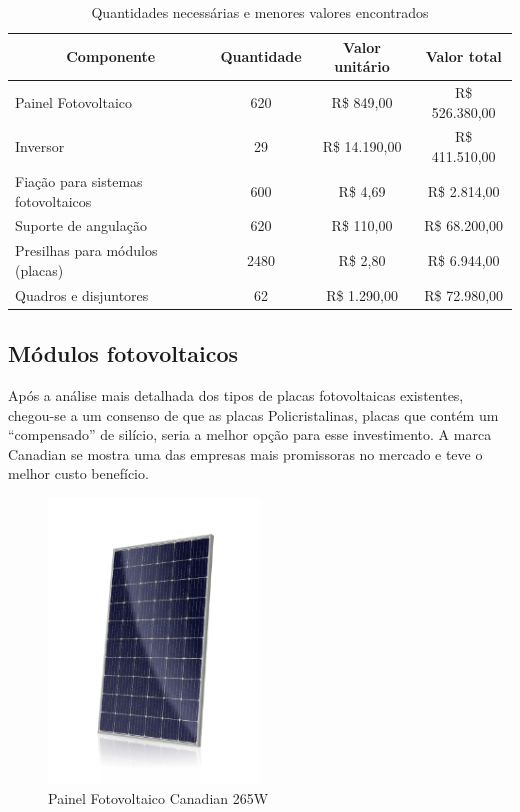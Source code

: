 \begin{table}[]
\centering
\caption{Quantidades necessárias e menores valores encontrados}
\begin{tabular}{|l|c|c|c|}
\hline
\multicolumn{1}{|c|}{\textbf{Componente}} & \textbf{Quantidade} & \textbf{Valor unitário} & \textbf{Valor total} \\ \hline
Painel Fotovoltaico                       & 620                 & R\$ 849,00              & R\$ 526.380,00       \\ \hline
Inversor                                  & 29                  & R\$ 14.190,00           & R\$ 411.510,00       \\ \hline
Fiação para sistemas fotovoltaicos        & 600                 & R\$ 4,69                & R\$ 2.814,00         \\ \hline
Suporte de angulação                      & 620                 & R\$ 110,00              & R\$ 68.200,00        \\ \hline
Presilhas para módulos (placas)           & 2480                & R\$ 2,80                & R\$ 6.944,00         \\ \hline
Quadros e disjuntores                     & 62                  & R\$ 1.290,00            & R\$ 72.980,00        \\ \hline
\end{tabular}
\end{table}

\subsection{Módulos fotovoltaicos}
Após a análise mais detalhada dos tipos de placas fotovoltaicas existentes, chegou-se a um consenso de que as placas Policristalinas, placas que contém um ``compensado'' de silício, seria a melhor opção para esse investimento. A marca Canadian se mostra uma das empresas mais promissoras no mercado e teve o melhor custo benefício.

\begin{figure}[h]
\centering
\includegraphics[width=0.5\textwidth]{figuras/painel1.PNG}
\caption{Painel Fotovoltaico Canadian 265W}
\end{figure}

